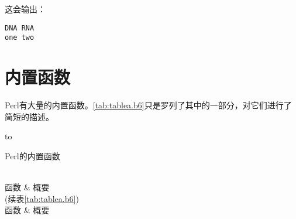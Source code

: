 这会输出：

\begin{lstlisting}
DNA RNA
one two
\end{lstlisting}

\section{内置函数}
Perl有大量的内置函数。\autoref{tab:tablea.b6}只是罗列了其中的一部分，对它们进行了简短的描述。

\begin{longtabu*} to \linewidth {X[2,l]X[5,l]}
  \caption{Perl的内置函数}
  \label{tab:tablea.b6}\\
      \toprule
      函数 & 概要\\
      \midrule
      \endfirsthead
      (续表\ref{tab:tablea.b6})\\
      \toprule
      函数 & 概要\\
      \midrule
      \endhead
      \midrule
      \\
      \endfoot
      \bottomrule
      \endlastfoot


\end{longtabu*}
